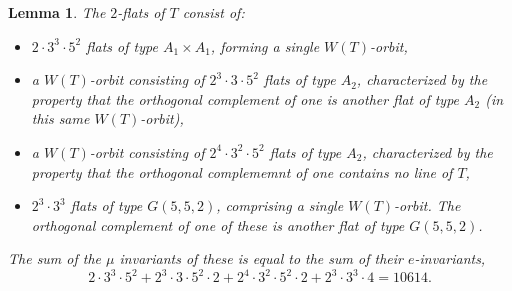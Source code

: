 \documentclass[11pt, reqno]{amsart}
\numberwithin{equation}{section}
\theoremstyle{definition}
\theoremstyle{plain}
\newtheorem{lemma}[theorem]{Lemma}
\begin{document}
\begin{lemma}
The $2$-flats of $T$ consist of:
\begin{itemize}
\item[(a)] $2 \cdot 3^3 \cdot 5^2$ flats of type $A_1 \times A_1$, forming a single $W(T)$-orbit,
\item[(b)] a $W(T)$-orbit consisting of $2^3 \cdot 3 \cdot 5^2$ flats of type $A_2$, characterized by the property that the orthogonal complement of one is another flat of type $A_2$ (in this same $W(T)$-orbit),
\item[(c)] a $W(T)$-orbit consisting of $2^4 \cdot 3^2 \cdot 5^2$ flats of type $A_2$, characterized by the property that the orthogonal complememnt of one contains no line of $T$,
\item[(d)] $2^3 \cdot 3^3$ flats of type $G(5,5,2)$, comprising a single $W(T)$-orbit. The orthogonal complement of one of these is another flat of type $G(5,5,2)$. 
\end{itemize} The sum of the $\mu$ invariants of these is equal to the sum of their $e$-invariants,
$$2 \cdot 3^3 \cdot 5^2 + 2^3 \cdot 3 \cdot 5^2 \cdot 2+2^4 \cdot 3^2 \cdot 5^2 \cdot 2+2^3 \cdot 3^3 \cdot 4=10614.$$
\end{lemma}
\end{document}
